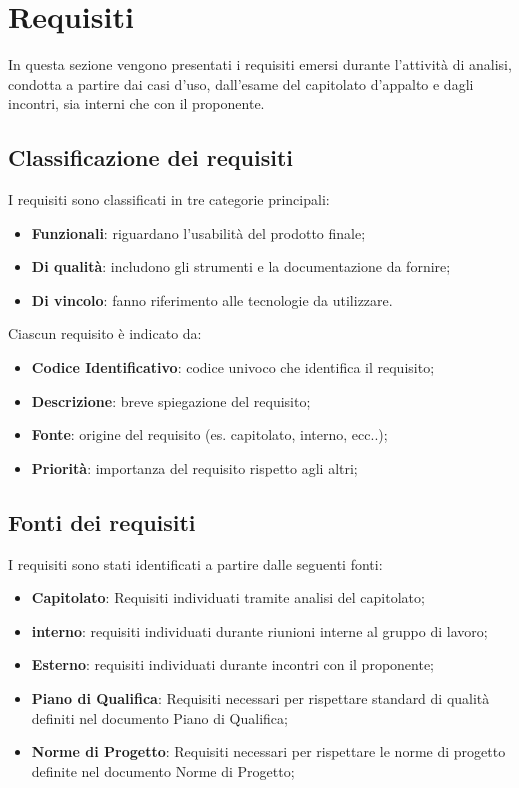 \section{Requisiti}
In questa sezione vengono presentati i requisiti emersi durante l'attività di analisi, 
condotta a partire dai casi d'uso, dall'esame del capitolato d'appalto e dagli incontri, 
sia interni che con il proponente. 

\subsection{Classificazione dei requisiti}
I requisiti sono classificati in tre categorie principali:  
\begin{itemize}
    \item \textbf{Funzionali}: riguardano l'usabilità del prodotto finale;  
    \item \textbf{Di qualità}: includono gli strumenti e la documentazione da fornire;  
    \item \textbf{Di vincolo}: fanno riferimento alle tecnologie da utilizzare.
\end{itemize}
Ciascun requisito è indicato da:
\begin{itemize}
    \item \textbf{Codice Identificativo}: codice univoco che identifica il requisito;
    \item \textbf{Descrizione}: breve spiegazione del requisito;
    \item \textbf{Fonte}: origine del requisito (es. capitolato, interno, ecc..);
    \item \textbf{Priorità}: importanza del requisito rispetto agli altri;
\end{itemize} 

\subsection{Fonti dei requisiti}
I requisiti sono stati identificati a partire dalle seguenti fonti:
\begin{itemize}
    \item \textbf{Capitolato}: Requisiti individuati tramite analisi del capitolato;
    \item \textbf{interno}: requisiti individuati durante riunioni interne al gruppo di lavoro;
    \item \textbf{Esterno}: requisiti individuati durante incontri con il proponente;
    \item \textbf{Piano di Qualifica}: Requisiti necessari per rispettare standard di qualità definiti nel documento Piano di Qualifica;
    \item \textbf{Norme di Progetto}: Requisiti necessari per rispettare le norme di progetto definite nel documento Norme di Progetto;
\end{itemize}

